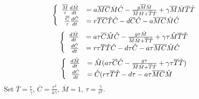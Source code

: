 {\center
\begin{frame}$$\begin{cases}
\begin{array}{rl}
\frac{\overline{M}}{\tau}\frac{d\HAT{M}}{dt}&= a\overline{M}\overline{C}\HAT{M}\HAT{C}-\frac{g\overline{M}\HAT{M}}{\overline{M}\HAT{M}+\overline{T}\HAT{T}} + \gamma \overline{M}\HAT{M}\overline{T}\HAT{T}\\ 
\frac{\overline{C}}{\tau}\frac{d\HAT{C}}{dt}&=r\overline{T}\overline{C}\HAT{T}\HAT{C}-d\overline{C}\HAT{C}-a\overline{M}\overline{C}\HAT{M}\HAT{C}
\end{array} \end{cases}$$$$\begin{cases}
\begin{array}{rl}
\frac{d\HAT{M}}{dt}&= a\tau\overline{C}\HAT{M}\HAT{C}-\frac{g\tau\HAT{M}}{\overline{M}\HAT{M}+\overline{T}\HAT{T}} + \gamma \tau\HAT{M}\overline{T}\HAT{T}\\ 
\frac{d\HAT{C}}{dt}&=r\tau\overline{T}\HAT{T}\HAT{C}-d\tau\HAT{C}-a\tau\overline{M}\overline{C}\HAT{M}\HAT{C}
\end{array} \end{cases}$$$$\begin{cases}
\begin{array}{rl}
\frac{d\HAT{M}}{dt}&= \HAT{M}(a\tau\overline{C}\HAT{C}-\frac{g\tau}{\overline{M}\HAT{M}+\overline{T}\HAT{T}} + \gamma \tau\overline{T}\HAT{T})\\ 
\frac{d\HAT{C}}{dt}&=\HAT{C}(r\tau\overline{T}\HAT{T}-d\tau-a\tau\overline{M}\overline{C}\HAT{M}
\end{array} \end{cases}$$ Set $\overline{T}=\frac{r}{\gamma}$, $\overline{C}=\frac{r^2}{a\gamma}$, $\overline{M}=1$, $\tau=\frac{\gamma}{r^2}$.
\end{frame}
}
